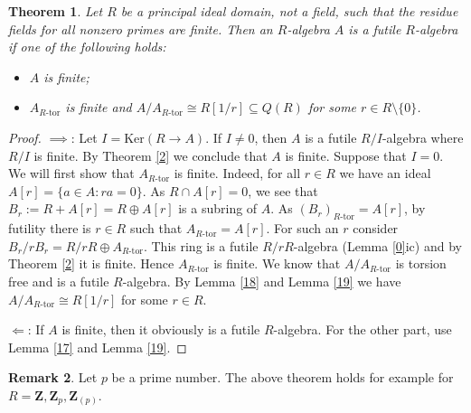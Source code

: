 \documentclass{amsart}
\theoremstyle{plain}
\newtheorem{theorem}{Theorem}[section]
\theoremstyle{definition}
\newtheorem{remark}[theorem]{Remark}
\begin{document}
\begin{theorem} \label{21}
Let $R$ be a principal ideal domain, not a field, such that the residue fields for all nonzero primes are finite. Then an $R$-algebra $A$ is a
futile $R$-algebra if one of the following holds:
\begin{itemize}
\item $A$ is finite;
\item $A_{R\textrm{-}\mathrm{tor}}$ is finite and $A/A_{R\textrm{-}\mathrm{tor}} \cong R[1/r] \subseteq Q(R)$ for some $r \in R \setminus \{0\}$.
\end{itemize}
\end{theorem}
\begin{proof}
$\implies$: Let $I=\mathrm{Ker}(R \to A)$. If $I \neq 0$, then $A$ is a futile $R/I$-algebra where $R/I$ is finite. By Theorem \ref{2} we conclude
that $A$ is
finite.
Suppose that $I=0$. We will first show that $A_{R\textrm{-}\mathrm{tor}}$ is finite. Indeed, for all $r \in R$ we have an
ideal $A[r]=\{a \in A: ra=0\}$. As $R \cap A[r]=0$, we see that $B_r:=R+A[r]=R \oplus A[r]$ is a subring of $A$. As $\left(B_r\right)_{R\textrm{-}\mathrm{tor}}=A[r]$, by futility there is $r \in R$ such that $A_{R\textrm{-}\mathrm{tor}}=A[r]$. For such an $r$ consider $B_r/rB_r= R/rR \oplus A_{R\textrm{-}\mathrm{tor}}$. This ring is
a futile $R/rR$-algebra (Lemma \ref{0}ic) and by Theorem \ref{2} it is finite. Hence $A_{R\textrm{-}\mathrm{tor}}$ is finite. We know that $A/A_{R\textrm{-}\mathrm{tor}}$ is torsion free
and is a futile $R$-algebra. By Lemma \ref{18} and Lemma \ref{19} we have $A/A_{R\textrm{-}\mathrm{tor}} \cong R[1/r]$ for some $r \in R$.

${\Longleftarrow}$: If $A$ is finite, then it obviously is a futile $R$-algebra. For the other part, use Lemma \ref{17} and Lemma \ref{19}. 
\end{proof}

\begin{remark}
Let $p$ be a prime number. The above theorem holds for example for $R={\mathbf{Z}}, {\mathbf{Z}}_{p}, {\mathbf{Z}}_{(p)}$.
\end{remark}
\end{document}
